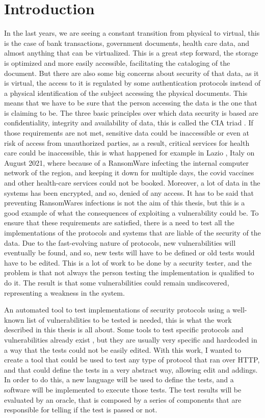 \chapter{Introduction}
In the last years, we are seeing a constant transition from physical to virtual, this is the case of bank transactions, government documents, health care data, and almost anything that can be virtualized. This is a great step forward, the storage is optimized and more easily accessible, facilitating the cataloging of the document. But there are also some big concerns about security of that data, as it is virtual, the access to it is regulated by some authentication protocols instead of a physical identification of the subject accessing the physical documents. This means that we have to be sure that the person accessing the data is the one that is claiming to be. The three basic principles over which data security is based are confidentiality, integrity and availability of data, this is called the CIA triad \cite{cia_triad}.
If those requirements are not met, sensitive data could be inaccessible or even at risk of access from unauthorized parties, as a result, critical services for health care could be inaccessible, this is what happened for example in Lazio \cite{lazio_hacker_0} \cite{lazio_hacker_1}, Italy on August 2021, where because of a RansomWare infecting the internal computer network of the region, and keeping it down for multiple days, the covid vaccines and other health-care services could not be booked. Moreover, a lot of data in the systems has been encrypted, and so, denied of any access. It has to be said that preventing RansomWares infections is not the aim of this thesis, but this is a good example of what the consequences of exploiting a vulnerability could be.
To ensure that these requirements are satisfied, there is a need to test all the implementations of the protocols and systems that are liable of the security of the data. Due to the fast-evolving nature of protocols, new vulnerabilities will eventually be found, and so, new tests will have to be defined or old tests would have to be edited. This is a lot of work to be done by a security tester, and the problem is that not always the person testing the implementation is qualified to do it. The result is that some vulnerabilities could remain undiscovered, representing a weakness in the system.

An automated tool to test implementations of security protocols using a well-known list of vulnerabilities to be tested is needed, this is what the work described in this thesis is all about. Some tools to test specific protocols and vulnerabilities already exist \cite{wendy_barreto}\cite{claudio_grisenti}, but they are usually very specific and hardcoded in a way that the tests could not be easily edited. With this work, I wanted to create a tool that could be used to test any type of protocol that ran over HTTP, and that could define the tests in a very abstract way, allowing edit and addings. In order to do this, a new language will be used to define the tests, and a software will be implemented to execute those tests. The test results will be evaluated by an oracle, that is composed by a series of components that are responsible for telling if the test is passed or not.


